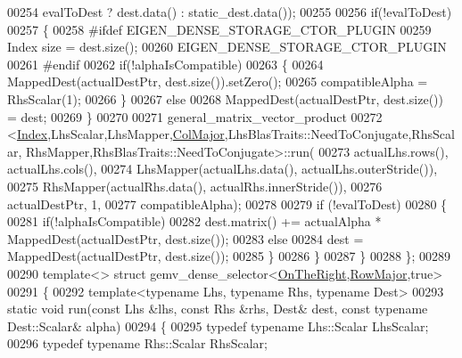 \begin{DoxyCode}
00254                                                     evalToDest ? dest.data() : static\_dest.data());
00255 
00256       \textcolor{keywordflow}{if}(!evalToDest)
00257       \{
00258 \textcolor{preprocessor}{        #ifdef EIGEN\_DENSE\_STORAGE\_CTOR\_PLUGIN}
00259         Index size = dest.size();
00260         EIGEN\_DENSE\_STORAGE\_CTOR\_PLUGIN
00261 \textcolor{preprocessor}{        #endif}
00262         \textcolor{keywordflow}{if}(!alphaIsCompatible)
00263         \{
00264           MappedDest(actualDestPtr, dest.size()).setZero();
00265           compatibleAlpha = RhsScalar(1);
00266         \}
00267         \textcolor{keywordflow}{else}
00268           MappedDest(actualDestPtr, dest.size()) = dest;
00269       \}
00270 
00271       general\_matrix\_vector\_product
00272           <\hyperlink{namespace_eigen_a62e77e0933482dafde8fe197d9a2cfde}{Index},LhsScalar,LhsMapper,\hyperlink{group__enums_ggaacded1a18ae58b0f554751f6cdf9eb13a0cbd4bdd0abcfc0224c5fcb5e4f6669a}{ColMajor},LhsBlasTraits::NeedToConjugate,RhsScalar,
      RhsMapper,RhsBlasTraits::NeedToConjugate>::run(
00273           actualLhs.rows(), actualLhs.cols(),
00274           LhsMapper(actualLhs.data(), actualLhs.outerStride()),
00275           RhsMapper(actualRhs.data(), actualRhs.innerStride()),
00276           actualDestPtr, 1,
00277           compatibleAlpha);
00278 
00279       \textcolor{keywordflow}{if} (!evalToDest)
00280       \{
00281         \textcolor{keywordflow}{if}(!alphaIsCompatible)
00282           dest.matrix() += actualAlpha * MappedDest(actualDestPtr, dest.size());
00283         \textcolor{keywordflow}{else}
00284           dest = MappedDest(actualDestPtr, dest.size());
00285       \}
00286     \}
00287   \}
00288 \};
00289 
00290 \textcolor{keyword}{template}<> \textcolor{keyword}{struct }gemv\_dense\_selector<\hyperlink{group__enums_ggac22de43beeac7a78b384f99bed5cee0ba99dc75d8e00b6c3a5bdc31940f47492b}{OnTheRight},\hyperlink{group__enums_ggaacded1a18ae58b0f554751f6cdf9eb13acfcde9cd8677c5f7caf6bd603666aae3}{RowMajor},true>
00291 \{
00292   \textcolor{keyword}{template}<\textcolor{keyword}{typename} Lhs, \textcolor{keyword}{typename} Rhs, \textcolor{keyword}{typename} Dest>
00293   \textcolor{keyword}{static} \textcolor{keywordtype}{void} run(\textcolor{keyword}{const} Lhs &lhs, \textcolor{keyword}{const} Rhs &rhs, Dest& dest, \textcolor{keyword}{const} \textcolor{keyword}{typename} Dest::Scalar& alpha)
00294   \{
00295     \textcolor{keyword}{typedef} \textcolor{keyword}{typename} Lhs::Scalar   LhsScalar;
00296     \textcolor{keyword}{typedef} \textcolor{keyword}{typename} Rhs::Scalar   RhsScalar;

\end{DoxyCode}
